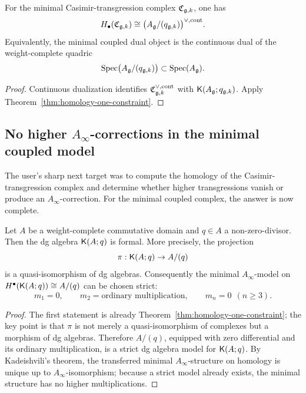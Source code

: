 \begin{corollary}\label{cor:minimal-sugawara-solved}
For the minimal Casimir-transgression complex \(\mathfrak C_{\mathfrak g,k}\), one has
\[
H_\bullet(\mathfrak C_{\mathfrak g,k})\cong \bigl(A_{\mathfrak g}/(q_{\mathfrak g,k})\bigr)^{\vee,\mathrm{cont}}.
\]
Equivalently, the minimal coupled dual object is the continuous dual of the weight-complete quadric
\[
\operatorname{Spec}\bigl(A_{\mathfrak g}/(q_{\mathfrak g,k})\bigr)\subset \operatorname{Spec}(A_{\mathfrak g}).
\]
\end{corollary}

\begin{proof}
Continuous dualization identifies \(\mathfrak C_{\mathfrak g,k}^{\vee,\mathrm{cont}}\) with \(\mathsf K(A_{\mathfrak g};q_{\mathfrak g,k})\). Apply Theorem~\ref{thm:homology-one-constraint}.
\end{proof}

\subsection{No higher \(A_\infty\)-corrections in the minimal coupled model}

The user's sharp next target was to compute the homology of the Casimir-transgression complex and determine whether higher transgressions vanish or produce an \(A_\infty\)-correction. For the minimal coupled complex, the answer is now complete.

\begin{theorem}\label{thm:quadric-rigidity}
Let \(A\) be a weight-complete commutative domain and \(q\in A\) a non-zero-divisor. Then the dg algebra \(\mathsf K(A;q)\) is formal. More precisely, the projection
\[
\pi:\mathsf K(A;q)\to A/(q)
\]
is a quasi-isomorphism of dg algebras. Consequently the minimal \(A_\infty\)-model on \(H^\bullet(\mathsf K(A;q))\cong A/(q)\) can be chosen strict:
\[
m_1=0,\qquad m_2=\text{ordinary multiplication},\qquad m_n=0\ \ (n\ge 3).
\]
\end{theorem}

\begin{proof}
The first statement is already Theorem~\ref{thm:homology-one-constraint}; the key point is that \(\pi\) is not merely a quasi-isomorphism of complexes but a morphism of dg algebras. Therefore \(A/(q)\), equipped with zero differential and its ordinary multiplication, is a strict dg algebra model for \(\mathsf K(A;q)\). By Kadeishvili's theorem, the transferred minimal \(A_\infty\)-structure on homology is unique up to \(A_\infty\)-isomorphism; because a strict model already exists, the minimal structure has no higher multiplications.
\end{proof}

